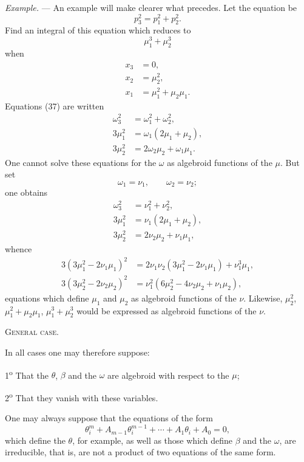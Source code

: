 \documentclass[11pt]{article}
\begin{document}
\emph{Example.} --- An example will make clearer what precedes. Let the equation be
\[
p_3^2=p_1^2+p_2^2.
\]
Find an integral of this equation which reduces to
\[
\mu_1^3+\mu_2^3
\]
when
\[
\begin{aligned}
x_3&=0,\\
x_2&=\mu_2^2,\\
x_1&=\mu_1^2+\mu_2\mu_1.
\end{aligned}
\]
Equations (37) are written
\[
\begin{aligned}
\omega_3^2&=\omega_1^2+\omega_2^2,\\
3\mu_1^2&=\omega_1(2\mu_1+\mu_2),\\
3\mu_2^2&=2\omega_2\mu_2+\omega_1\mu_1.
\end{aligned}
\]
One cannot solve these equations for the $\omega$ as algebroid functions of the $\mu$.
But set
\[
\omega_1=\nu_1,
\qquad
\omega_2=\nu_2;
\]
one obtains
\[
\begin{aligned}
\omega_3^2&=\nu_1^2+\nu_2^2,\\
3\mu_1^2&=\nu_1(2\mu_1+\mu_2),\\
3\mu_2^2&=2\nu_2\mu_2+\nu_1\mu_1,
\end{aligned}
\]
whence
\[
\begin{aligned}
3(3\mu_1^2-2\nu_1\mu_1)^2&=2\nu_1\nu_2(3\mu_1^2-2\nu_1\mu_1)+\nu_1^3\mu_1,\\
3(3\mu_2^2-2\nu_2\mu_2)^2&=\nu_1^2(6\mu_2^2-4\nu_2\mu_2+\nu_1\mu_2),
\end{aligned}
\]
equations which define $\mu_1$ and $\mu_2$ as algebroid functions of the $\nu$. Likewise, $\mu_2^2$, $\mu_1^2+\mu_2\mu_1$, $\mu_1^3+\mu_2^3$ would be expressed as algebroid functions of the $\nu$.

\begin{center}
{\scshape General case.}
\end{center}

In all cases one may therefore suppose:

1\textsuperscript{o} That the $\theta$, $\beta$ and the $\omega$ are algebroid with respect to the $\mu$;

2\textsuperscript{o} That they vanish with these variables.

One may always suppose that the equations of the form
\[
\theta_i^m+A_{m-1}\theta_i^{m-1}+\cdots+A_1\theta_i+A_0=0,
\]
which define the $\theta$, for example, as well as those which define $\beta$ and the $\omega$, are irreducible, that is, are not a product of two equations of the same form.
\end{document}
